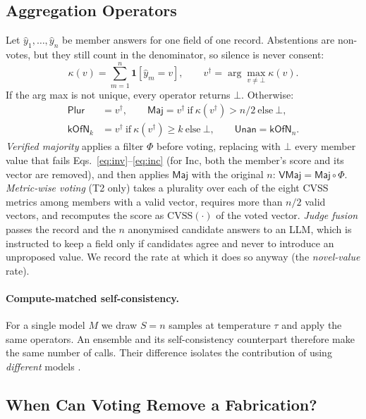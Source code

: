 \documentclass[11pt]{article}
\begin{document}
\subsection{Aggregation Operators}
Let $\hat y_1,\dots,\hat y_n$ be member answers for one field of one record. Abstentions are non-votes, but they still count in the denominator, so silence is never consent:
\begin{equation}\label{eq:count}
\kappa(v)=\textstyle\sum_{m=1}^{n}\mathbf{1}[\hat y_m=v],\qquad v^\dagger=\arg\max_{v\neq\bot}\kappa(v).
\end{equation}
If the arg max is not unique, every operator returns $\bot$. Otherwise:
\begin{align}
\mathsf{Plur}&=v^\dagger, \qquad
\mathsf{Maj}=v^\dagger\ \text{if}\ \kappa(v^\dagger)>n/2\ \text{else}\ \bot,\label{eq:maj}\\
\mathsf{kOfN}_k&=v^\dagger\ \text{if}\ \kappa(v^\dagger)\ge k\ \text{else}\ \bot, \qquad
\mathsf{Unan}=\mathsf{kOfN}_n.\label{eq:kofn}
\end{align}
\emph{Verified majority} applies a filter $\Phi$ before voting, replacing with $\bot$ every member value that fails Eqs.~\eqref{eq:inv}--\eqref{eq:inc} (for $\mathrm{Inc}$, both the member's score and its vector are removed), and then applies $\mathsf{Maj}$ with the original $n$: $\mathsf{VMaj}=\mathsf{Maj}\circ\Phi$. \emph{Metric-wise voting} (T2 only) takes a plurality over each of the eight CVSS metrics among members with a valid vector, requires more than $n/2$ valid vectors, and recomputes the score as $\mathrm{CVSS}(\cdot)$ of the voted vector. \emph{Judge fusion} passes the record and the $n$ anonymised candidate answers to an LLM, which is instructed to keep a field only if candidates agree and never to introduce an unproposed value. We record the rate at which it does so anyway (the \emph{novel-value} rate).

\paragraph{Compute-matched self-consistency.} For a single model $M$ we draw $S=n$ samples at temperature $\tau$ and apply the same operators. An ensemble and its self-consistency counterpart therefore make the same number of calls. Their difference isolates the contribution of using \emph{different} models \citep{wang2023selfconsistency}.

\subsection{When Can Voting Remove a Fabrication?}
\end{document}
